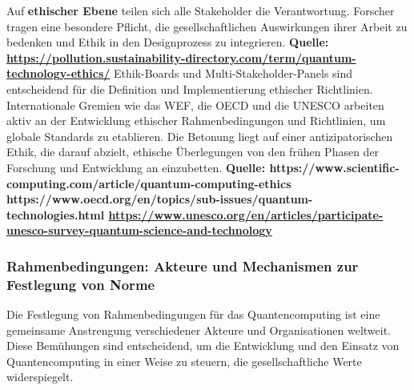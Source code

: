 Auf \textbf{ethischer Ebene} teilen sich alle Stakeholder die Verantwortung. Forscher tragen eine besondere Pflicht, die gesellschaftlichen Auswirkungen ihrer Arbeit zu bedenken und Ethik in den Designprozess zu integrieren. \textbf{Quelle: \href{https://pollution.sustainability-directory.com/term/quantum-technology-ethics/}{https://pollution.sustainability-directory.com/term/quantum-technology-ethics/}} Ethik-Boards und Multi-Stakeholder-Panels sind entscheidend für die Definition und Implementierung ethischer Richtlinien. Internationale Gremien wie das WEF, die OECD und die UNESCO arbeiten aktiv an der Entwicklung ethischer Rahmenbedingungen und Richtlinien, um globale Standards zu etablieren. Die Betonung liegt auf einer antizipatorischen Ethik, die darauf abzielt, ethische Überlegungen von den frühen Phasen der Forschung und Entwicklung an einzubetten. \textbf{Quelle: https://www.scientific-computing.com/article/quantum-computing-ethics https://www.oecd.org/en/topics/sub-issues/quantum-technologies.html \href{https://www.unesco.org/en/articles/participate-unesco-survey-quantum-science-and-technology}{https://www.unesco.org/en/articles/participate-unesco-survey-quantum-science-and-technology}}

\subsubsection{Rahmenbedingungen: Akteure und Mechanismen zur Festlegung von Norme}
Die Festlegung von Rahmenbedingungen für das Quantencomputing ist eine gemeinsame Anstrengung verschiedener Akteure und Organisationen weltweit. Diese Bemühungen sind entscheidend, um die Entwicklung und den Einsatz von Quantencomputing in einer Weise zu steuern, die gesellschaftliche Werte widerspiegelt.

